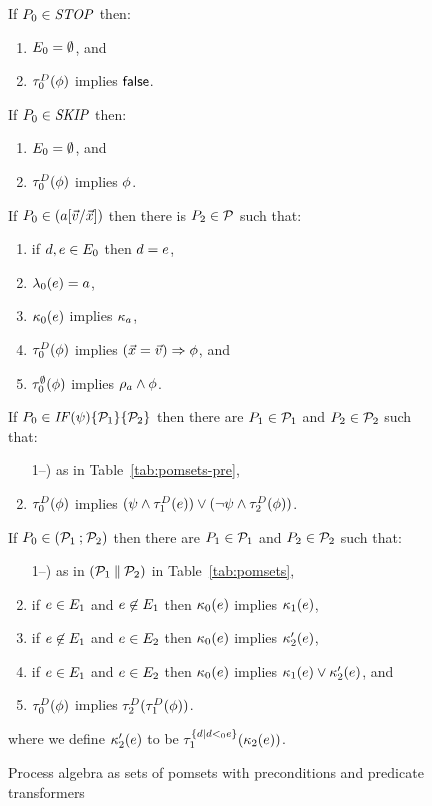 \begin{figure*}
  If $\aPS_0\in\sSTOP$ then:
  \begin{enumerate}
    \item $\aEvs_0 = \emptyset$, and
  \item $\aTr[\bEvs]_0(\aForm)$ implies $\FALSE$.
  \end{enumerate}
  If $\aPS_0\in\sSKIP$ then:
  \begin{enumerate}
  \item $\aEvs_0 = \emptyset$, and
  \item $\aTr[\bEvs]_0(\aForm)$ implies $\aForm$.
  \end{enumerate}
  If $\aPS_0 \in (\aAct[\vec\aVal/\vec\aVar])$ then there is $\aPS_2\in\aPSS$ such that:
  \begin{enumerate}
  \item if $\bEv,\aEv\in\aEvs_0$ then $\bEv=\aEv$,
  \item $\labelingAct_0(\aEv) = \aAct$,
  \item $\labelingForm_0(\aEv)$ implies $\preForm_\aAct$,
  \item $\aTr[\bEvs]_0(\aForm)$ implies $(\vec\aVar=\vec\aVal)\Rightarrow\aForm$, and
  \item $\aTr[\emptyset]_0(\aForm)$ implies $\reorderIndForm_\aAct\land\aForm$.
  \end{enumerate}
  If $\aPS_0 \in \sIF{\bForm}\sTHEN\aPSS_1\sELSE\aPSS_2\sFI$ then
  there are $\aPS_1\in\aPSS_1$ and $\aPS_2\in\aPSS_2$ such that:
  \begin{enumerate}
  \setcounter{enumi}{\value{pomsetPreIfCount}}
  \item[1--\thepomsetPreIfCount)] as in Table~\ref{tab:pomsets-pre},
  \item $\aTr[\bEvs]_0(\aForm)$ implies $(\bForm\land\aTr[\bEvs]_1(\aEv))\lor(\neg\bForm\land\aTr[\bEvs]_2(\aForm))$.
  \end{enumerate}
  If $\aPS_0 \in (\aPSS_1\wSEMI\aPSS_2)$ then
  there are $\aPS_1\in\aPSS_1$ and $\aPS_2\in\aPSS_2$ such that:
  \begin{enumerate}
  \setcounter{enumi}{\value{pomsetwParCount}}
  \item[1--\thepomsetwParCount)] as in $(\aPSS_1\sPAR\aPSS_2)$  in Table~\ref{tab:pomsets},
  \item if $\aEv\in\aEvs_1$ and $\aEv\not\in\aEvs_1$ then $\labelingForm_0(\aEv)$ implies $\labelingForm_1(\aEv)$,
  \item if $\aEv\not\in\aEvs_1$ and $\aEv\in\aEvs_2$ then $\labelingForm_0(\aEv)$ implies $\labelingForm'_2(\aEv)$,
  \item if $\aEv\in\aEvs_1$ and $\aEv\in\aEvs_2$ then $\labelingForm_0(\aEv)$ implies $\labelingForm_1(\aEv)\lor\labelingForm'_2(\aEv)$, and
  \item $\aTr[\bEvs]_0(\aForm)$ implies $\aTr[\bEvs]_2(\aTr[\bEvs]_1(\aForm))$.
  \end{enumerate}
  where we define $\labelingForm'_2(\aEv)$ to be $\aTr[\{ \bEv \mid \bEv <_0 \aEv \}]_1(\labelingForm_2(\aEv))$.
\caption{Process algebra as sets of pomsets with preconditions and predicate transformers}
\end{figure*}

